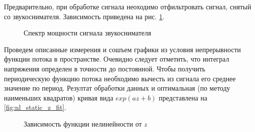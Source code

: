 \documentclass{article}
\begin{document}
Предварительно, при обработке сигнала неоходимо отфильтровать сигнал, снятый со звукоснимателя. Зависимость приведена на
рис. \ref{fig:spectrum}.

\begin{figure}
    \centering
    
    \caption{Спектр мощности сигнала звукоснимателя}
    \label{fig:spectrum}
\end{figure}

\pagebreak

Проведем описанные измерения и сошъем графики из условия непрерывности функции потока в пространстве. 
Очевидно следует отметить, что интеграл напряжения определен в точности до постоянной. Чтобы получить периодическую функцию потока
необходимо вычесть из сигнала его среднее значение по период.
Резултат обработки данных и оптимальная (по методу наименьших квадратов)
кривая вида $exp(a z + b)$ представлена на \ref{fig:nl_static_z_fit}.

\begin{figure}
    \centering
    
    \caption{Зависимость функции нелинейности от $z$}
    \label{fig:nl_static_z}
\end{figure}

\printbibliography
\end{document}
